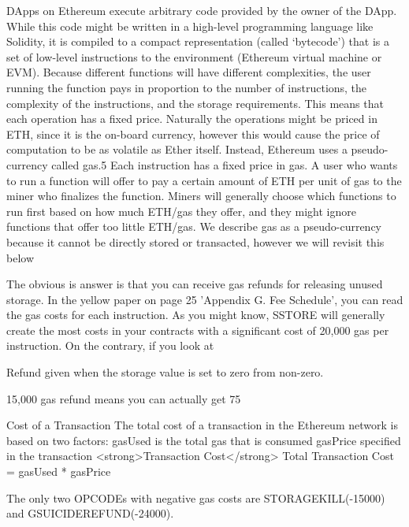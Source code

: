 DApps on Ethereum execute arbitrary code provided by the owner of the DApp. While this code might be written
in a high-level programming language like Solidity, it is compiled to a compact representation (called ‘bytecode’)
that is a set of low-level instructions to the environment (Ethereum virtual machine or EVM). Because different
functions will have different complexities, the user running the function pays in proportion to the number of
instructions, the complexity of the instructions, and the storage requirements. This means that each operation has a fixed price. Naturally the operations might be priced in ETH, since it is the on-board currency, however this
would cause the price of computation to be as volatile as Ether itself. Instead, Ethereum uses a pseudo-currency
called gas.5 Each instruction has a fixed price in gas. A user who wants to run a function will offer to pay a certain
amount of ETH per unit of gas to the miner who finalizes the function. Miners will generally choose which
functions to run first based on how much ETH/gas they offer, and they might ignore functions that offer too little
ETH/gas. We describe gas as a pseudo-currency because it cannot be directly stored or transacted, however we
will revisit this below



The obvious is answer is that you can receive gas refunds for releasing unused storage. In the yellow paper on page 25 'Appendix G. Fee Schedule', you can read the gas costs for each instruction. As you might know, SSTORE will generally create the most costs in your contracts with a significant cost of 20,000 gas per instruction. On the contrary, if you look at %

Refund given when the storage value is set to zero from non-zero.

15,000 gas refund means you can actually get 75%


Cost of a Transaction
The total cost of a transaction in the Ethereum network is based on two factors:
gasUsed is the total gas that is consumed
gasPrice specified in the transaction
<strong>Transaction Cost</strong>
Total Transaction Cost = gasUsed * gasPrice





The only two OPCODEs with negative gas costs are STORAGEKILL(-15000) and GSUICIDEREFUND(-24000).

